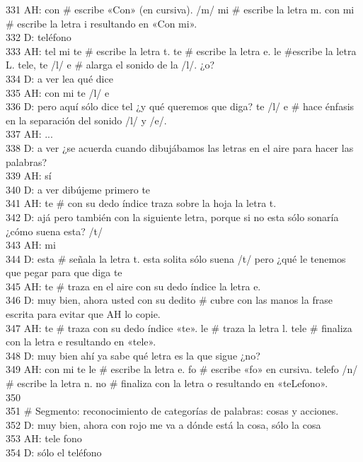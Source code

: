 331 AH: con \# escribe «Con» (en cursiva). /m/ mi \# escribe la letra m. con mi \# escribe la letra i resultando en «Con mi».\\
332 D: teléfono\\
333 AH: tel mi te \# escribe la letra t. te \# escribe la letra e. le \#escribe la letra L. tele, te /l/ e \# alarga el sonido de la /l/. ¿o?\\
334 D: a ver lea qué dice\\
335 AH: con mi te /l/ e\\
336 D: pero aquí sólo dice tel ¿y qué queremos que diga? te /l/ e \# hace énfasis en la separación del sonido /l/ y /e/.\\
337 AH: ...\\
338 D: a ver ¿se acuerda cuando dibujábamos las letras en el aire para hacer las palabras?\\
339 AH: sí\\
340 D: a ver dibújeme primero te\\
341 AH: te \# con su dedo índice traza sobre la hoja la letra t.\\
342 D: ajá pero también con la siguiente letra, porque si no esta sólo sonaría ¿cómo suena esta? /t/\\
343 AH: mi\\
344 D: esta \# señala la letra t. esta solita sólo suena /t/ pero ¿qué le tenemos que pegar para que diga te\\
345 AH: te \# traza en el aire con su dedo índice la letra e.\\
346 D: muy bien, ahora usted con su dedito \# cubre con las manos la frase escrita para evitar que AH lo copie.\\
347 AH: te \# traza con su dedo índice «te». le \# traza la letra l. tele \# finaliza con la letra e resultando en «tele».\\
348 D: muy bien ahí ya sabe qué letra es la que sigue ¿no?\\
349 AH: con mi te le \# escribe la letra e. fo \# escribe «fo» en cursiva. telefo /n/ \# escribe la letra n. no \# finaliza con la letra o resultando en «teLefono».\\
350 \\
351 \# Segmento: reconocimiento de categorías de palabras: cosas y acciones.\\
352 D: muy bien, ahora con rojo me va a dónde está la cosa, sólo la cosa\\
353 AH: tele fono\\
354 D: sólo el teléfono\\
